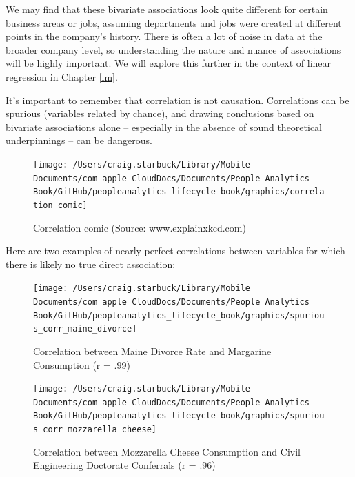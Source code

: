 \documentclass[
]{book}
\begin{document}
We may find that these bivariate associations look quite different for certain business areas or jobs, assuming departments and jobs were created at different points in the company's history. There is often a lot of noise in data at the broader company level, so understanding the nature and nuance of associations will be highly important. We will explore this further in the context of linear regression in Chapter \ref{lm}.

It's important to remember that correlation is not causation. Correlations can be spurious (variables related by chance), and drawing conclusions based on bivariate associations alone -- especially in the absence of sound theoretical underpinnings -- can be dangerous.

\begin{figure}

{\centering \texttt{[image: /Users/craig.starbuck/Library/Mobile Documents/com~apple~CloudDocs/Documents/People Analytics Book/GitHub/peopleanalytics\_lifecycle\_book/graphics/correlation\_comic]} 

}

\caption{Correlation comic (Source: www.explainxkcd.com)}\label{fig:corr-comic}
\end{figure}

Here are two examples of nearly perfect correlations between variables for which there is likely no true direct association:

\begin{figure}

{\centering \texttt{[image: /Users/craig.starbuck/Library/Mobile Documents/com~apple~CloudDocs/Documents/People Analytics Book/GitHub/peopleanalytics\_lifecycle\_book/graphics/spurious\_corr\_maine\_divorce]} 

}

\caption{Correlation between Maine Divorce Rate and Margarine Consumption (r = .99)}\label{fig:spur-corr-1}
\end{figure}

\begin{figure}

{\centering \texttt{[image: /Users/craig.starbuck/Library/Mobile Documents/com~apple~CloudDocs/Documents/People Analytics Book/GitHub/peopleanalytics\_lifecycle\_book/graphics/spurious\_corr\_mozzarella\_cheese]} 

}

\caption{Correlation between Mozzarella Cheese Consumption and Civil Engineering Doctorate Conferrals (r = .96)}\label{fig:spur-corr-2}
\end{figure}
\end{document}
